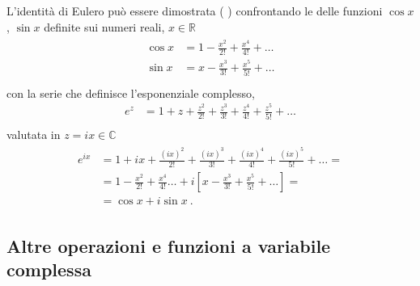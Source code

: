 \documentclass[letterpaper,10pt,italian]{jupyterBook}
\begin{document}
\sphinxAtStartPar
L’identità di Eulero può essere dimostrata ( ) confrontando le {\hyperref[\detokenize{ch/infinitesimal_calculus/derivatives:infinitesimal-calculus-derivatives-taylor}]{}} delle funzioni \(\cos x\), \(\sin x\) definite sui numeri reali, \(x \in \mathbb{R}\)
\begin{equation*}
\begin{split}\begin{aligned}
  \cos x & = 1 - \frac{x^2}{2!} + \frac{x^4}{4!} + \dots \\
  \sin x & = x - \frac{x^3}{3!} + \frac{x^5}{5!} + \dots \\
\end{aligned}\end{split}
\end{equation*}
\sphinxAtStartPar
con la serie che definisce l’esponenziale complesso,
\begin{equation*}
\begin{split}
  e^z & = 1 + z + \frac{z^2}{2!} + \frac{z^3}{3!} + \frac{z^4}{4!} + \frac{z^5}{5!} + \dots \\
\end{split}
\end{equation*}
\sphinxAtStartPar
valutata in \(z = i x \in \mathbb{C}\)
\begin{equation*}
\begin{split}\begin{aligned}
  e^{i x} 
      & = 1 + i x + \frac{(i x)^2}{2!} + \frac{(i x)^3}{3!} + \frac{(i x)^4}{4!} + \frac{(i x)^5}{5!} + \dots = \\
      & = 1 - \frac{x^2}{2!} + \frac{x^4}{4!} \dots + i \left[ x - \frac{x^3}{3!} + \frac{x^5}{5!}  + \dots \right] = \\
      & = \cos x + i \sin x \ .
\end{aligned}\end{split}
\end{equation*}

\subsection{Altre operazioni e funzioni a variabile complessa}
\label{\detokenize{ch/algebra/complex-algebra-notes:altre-operazioni-e-funzioni-a-variabile-complessa}}\label{\detokenize{ch/algebra/complex-algebra-notes:math-hs-algebra-complex-notes-fun}}
\end{document}
